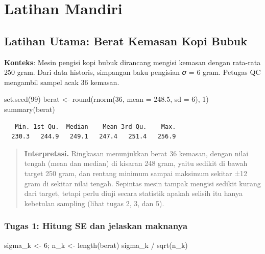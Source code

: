 \documentclass[
  indonesian,
  letterpaper,
]{book}
\newenvironment{Shaded}{\begin{snugshade}}{\end{snugshade}}
\newcommand{\AttributeTok}[1]{\textcolor[rgb]{0.40,0.45,0.13}{#1}}
\newcommand{\DecValTok}[1]{\textcolor[rgb]{0.68,0.00,0.00}{#1}}
\newcommand{\FloatTok}[1]{\textcolor[rgb]{0.68,0.00,0.00}{#1}}
\newcommand{\FunctionTok}[1]{\textcolor[rgb]{0.28,0.35,0.67}{#1}}
\newcommand{\NormalTok}[1]{\textcolor[rgb]{0.00,0.23,0.31}{#1}}
\newcommand{\OtherTok}[1]{\textcolor[rgb]{0.00,0.23,0.31}{#1}}
\newcommand{\SpecialCharTok}[1]{\textcolor[rgb]{0.37,0.37,0.37}{#1}}
\begin{document}
\section{Latihan Mandiri}\label{latihan-mandiri}

\subsection{Latihan Utama: Berat Kemasan Kopi
Bubuk}\label{latihan-utama-berat-kemasan-kopi-bubuk}

\textbf{Konteks}: Mesin pengisi kopi bubuk dirancang mengisi kemasan
dengan rata-rata 250 gram. Dari data historis, simpangan baku pengisian
𝜎 = 6 gram. Petugas QC mengambil sampel acak 36 kemasan.

\begin{Shaded}
\begin{Highlighting}[]
\FunctionTok{set.seed}\NormalTok{(}\DecValTok{99}\NormalTok{)}
\NormalTok{berat }\OtherTok{\textless{}{-}} \FunctionTok{round}\NormalTok{(}\FunctionTok{rnorm}\NormalTok{(}\DecValTok{36}\NormalTok{, }\AttributeTok{mean =} \FloatTok{248.5}\NormalTok{, }\AttributeTok{sd =} \DecValTok{6}\NormalTok{), }\DecValTok{1}\NormalTok{)}
\FunctionTok{summary}\NormalTok{(berat)}
\end{Highlighting}
\end{Shaded}

\begin{verbatim}
   Min. 1st Qu.  Median    Mean 3rd Qu.    Max. 
  230.3   244.9   249.1   247.4   251.4   256.9 
\end{verbatim}

\begin{quote}
\textbf{Interpretasi.} Ringkasan menunjukkan berat 36 kemasan, dengan
nilai tengah (mean dan median) di kisaran 248 gram, yaitu sedikit di
bawah target 250 gram, dan rentang minimum sampai maksimum sekitar ±12
gram di sekitar nilai tengah. Sepintas mesin tampak mengisi sedikit
kurang dari target, tetapi perlu diuji secara statistik apakah selisih
itu hanya kebetulan sampling (lihat tugas 2, 3, dan 5).
\end{quote}

\subsubsection{Tugas 1: Hitung SE dan jelaskan
maknanya}\label{tugas-1-hitung-se-dan-jelaskan-maknanya}

\begin{Shaded}
\begin{Highlighting}[]
\NormalTok{sigma\_k }\OtherTok{\textless{}{-}} \DecValTok{6}\NormalTok{; n\_k }\OtherTok{\textless{}{-}} \FunctionTok{length}\NormalTok{(berat)}
\NormalTok{sigma\_k }\SpecialCharTok{/} \FunctionTok{sqrt}\NormalTok{(n\_k)}
\end{Highlighting}
\end{Shaded}
\end{document}
